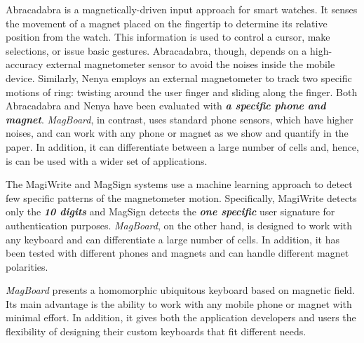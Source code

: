 \documentclass[conference]{IEEEtran}
\def \sys {\textit{MagBoard}}
\begin{document}
Abracadabra \cite{harrison2009abracadabra} is a magnetically-driven input approach for smart watches. It senses the movement of a magnet placed on the fingertip to determine its relative position from the watch. This information is used to control a cursor, make selections, or issue basic gestures. Abracadabra, though, depends on a high-accuracy external magnetometer sensor to avoid the noises inside the mobile device. Similarly, Nenya \cite{ashbrook2011nenya} employs an external magnetometer to track two specific motions of ring: twisting around the user finger and sliding along the finger. Both Abracadabra and Nenya have been evaluated with \textbf{\emph{a specific phone and magnet}}. \sys{}, in contrast, uses standard phone sensors, which have higher noises, and can work with any phone or magnet as we show and quantify in the paper. In addition, it can differentiate between a large number of cells and, hence, is can be used with a wider set of applications. 

The MagiWrite \cite{ketabdar2010magiwrite} and MagSign \cite{ketabdar2010magisign} systems use a machine learning approach to detect few specific patterns of the magnetometer motion. Specifically, MagiWrite detects only the \textbf{\emph{10 digits}} and MagSign detects the \textbf{\emph{one specific}} user signature for authentication purposes.
\sys{}, on the other hand, is designed to work with any keyboard and can differentiate a large number of cells. In addition, it has been tested with different phones and magnets and can handle different magnet polarities.

\sys{} presents a homomorphic ubiquitous keyboard based on magnetic field. Its main advantage is the ability to work with any mobile phone or magnet with minimal effort. In addition, it gives both the application developers and users the flexibility of designing their custom keyboards that fit different needs. 
\end{document}
